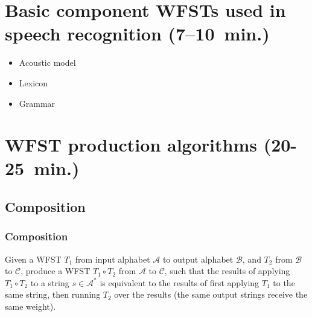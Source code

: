 \documentclass{beamer}
\newcommand{\<}{\langle}
\renewcommand{\>}{\rangle}
\begin{document}
\section{Basic component WFSTs used in speech recognition (7--10~min.)}
\begin{frame}
  \begin{itemize}
  \item Acoustic model
  \item Lexicon
  \item Grammar
  \end{itemize}
\end{frame}
\section{WFST production algorithms (20-25~min.)}

\subsection{Composition}

\begin{frame}
  \frametitle{Composition}

  Given a WFST $T_1$ from input alphabet $\mathcal{A}$ to output alphabet
  $\mathcal{B}$, and $T_2$ from $\mathcal{B}$ to $\mathcal{C}$, produce a WFST $T_1 \circ
  T_2$ from $\mathcal{A}$ to $\mathcal{C}$, such that the results of applying $T_1
  \circ T_2$ to a string $s \in \mathcal{A}^*$ is equivalent to the results of
  first applying $T_1$ to the same string, then running $T_2$ over the
  results (the same output strings receive the same weight).
\end{frame}
\end{document}
